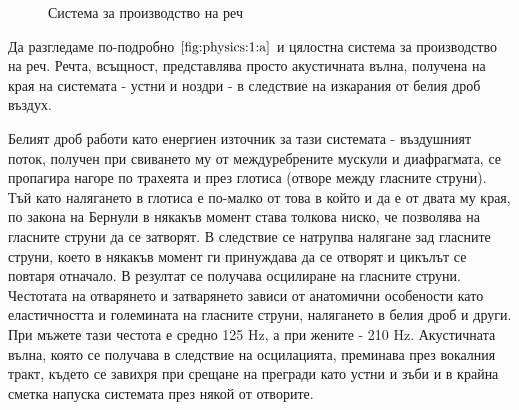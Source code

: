 \documentclass[12pt]{report}
\numberwithin{equation}{section}
\numberwithin{figure}{section}
\begin{document}
\begin{figure}[ht]
\begin{changemargin}{0cm}{0cm}
{                %
            }
        \end{changemargin} 

        \caption{Система за производство на реч}%
        \label{fig:physics:1}
    \end{figure}
    
    Да разгледаме по-подробно $\autoref{fig:physics:1:a}$ и цялостна система за производство на реч.
    Речта, всъщност, представлява просто акустичната вълна, получена на края на системата - устни и ноздри - в следствие на изкарания от белия дроб въздух.

    Белият дроб работи като енергиен източник за тази системата - въздушният поток, получен при свиването му от междуребрените мускули и диафрагмата,
    се пропагира нагоре по трахеята и през глотиса (отворе между гласните струни). Тъй като налягането в глотиса е по-малко от това в който и да е от двата му края, по закона на Бернули
    в някакъв момент става толкова ниско, че позволява на гласните струни да се затворят. В следствие се натрупва налягане зад гласните струни, което в някакъв момент ги принуждава
    да се отворят и цикълът се повтаря отначало. В резултат се получава осцилиране на гласните струни. Честотата на отварянето и затварянето зависи от анатомични особености като еластичността и големината на
    гласните струни, налягането в белия дроб и други. При мъжете тази честота е средно 125 Hz, а при жените - 210 Hz. Акустичната вълна, която се получава в следствие на осцилацията,
    преминава през вокалния тракт, където се завихря при срещане на прегради като устни и зъби и в крайна сметка напуска системата през някой от отворите.
\end{document}
